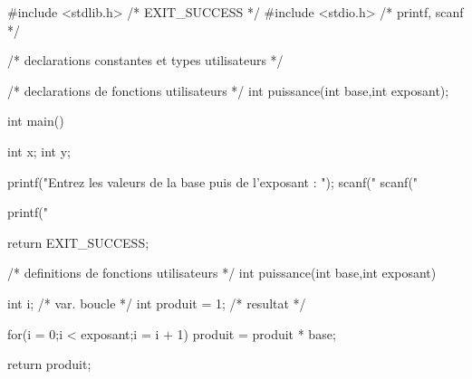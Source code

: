 \begin{small}
\begin{listing}{1}
#include <stdlib.h> /* EXIT_SUCCESS */
#include <stdio.h> /* printf, scanf */

/* declarations constantes et types utilisateurs */

/* declarations de fonctions utilisateurs */
int puissance(int base,int exposant);

int main()
{
    int x;
    int y;
    
    printf("Entrez les valeurs de la base puis de l'exposant : ");
    scanf("%
    scanf("%
    
    printf("%

    return EXIT_SUCCESS;
}

/* definitions de fonctions utilisateurs */
int puissance(int base,int exposant)
{
    int i; /* var. boucle */
    int produit = 1; /* resultat */

    for(i = 0;i < exposant;i = i + 1)
    {
        produit = produit * base;
    }

    return produit;
}
\end{listing}
\end{small}

